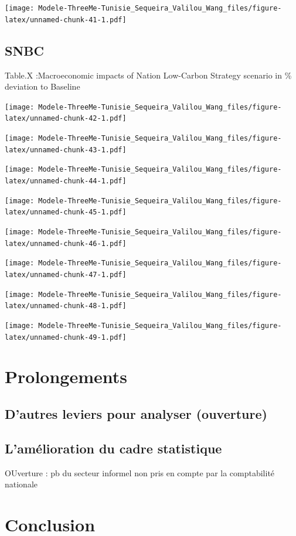 \documentclass[
]{article}
\begin{document}
\texttt{[image: Modele-ThreeMe-Tunisie\_Sequeira\_Valilou\_Wang\_files/figure-latex/unnamed-chunk-41-1.pdf]}

\hypertarget{snbc-1}{%
\subsection{SNBC}\label{snbc-1}}

Table.X :Macroeconomic impacts of Nation Low-Carbon Strategy scenario in
\% deviation to Baseline

\texttt{[image: Modele-ThreeMe-Tunisie\_Sequeira\_Valilou\_Wang\_files/figure-latex/unnamed-chunk-42-1.pdf]}

\texttt{[image: Modele-ThreeMe-Tunisie\_Sequeira\_Valilou\_Wang\_files/figure-latex/unnamed-chunk-43-1.pdf]}

\texttt{[image: Modele-ThreeMe-Tunisie\_Sequeira\_Valilou\_Wang\_files/figure-latex/unnamed-chunk-44-1.pdf]}

\texttt{[image: Modele-ThreeMe-Tunisie\_Sequeira\_Valilou\_Wang\_files/figure-latex/unnamed-chunk-45-1.pdf]}

\texttt{[image: Modele-ThreeMe-Tunisie\_Sequeira\_Valilou\_Wang\_files/figure-latex/unnamed-chunk-46-1.pdf]}

\texttt{[image: Modele-ThreeMe-Tunisie\_Sequeira\_Valilou\_Wang\_files/figure-latex/unnamed-chunk-47-1.pdf]}

\texttt{[image: Modele-ThreeMe-Tunisie\_Sequeira\_Valilou\_Wang\_files/figure-latex/unnamed-chunk-48-1.pdf]}

\texttt{[image: Modele-ThreeMe-Tunisie\_Sequeira\_Valilou\_Wang\_files/figure-latex/unnamed-chunk-49-1.pdf]}

\hypertarget{prolongements}{%
\section{Prolongements}\label{prolongements}}

\hypertarget{dautres-leviers-pour-analyser-ouverture}{%
\subsection{D'autres leviers pour analyser
(ouverture)}\label{dautres-leviers-pour-analyser-ouverture}}

\hypertarget{lamuxe9lioration-du-cadre-statistique}{%
\subsection{L'amélioration du cadre
statistique}\label{lamuxe9lioration-du-cadre-statistique}}

OUverture : pb du secteur informel non pris en compte par la
comptabilité nationale

\hypertarget{conclusion}{%
\section{Conclusion}\label{conclusion}}

\printbibliography[title=Bibliographie]
\end{document}
